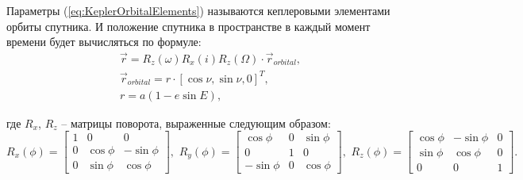 Параметры (\ref{eq:KeplerOrbitalElements}) называются кеплеровыми элементами
орбиты спутника.
И положение спутника в пространстве в каждый момент времени будет вычисляться по формуле:
\begin{equation}
  \begin{aligned}
    & \vec{r} = R_z(\omega)R_x(i)R_z(\Omega) \cdot \vec{r}_{orbital}, \\
    & \vec{r}_{orbital} = r \cdot [\cos\nu, \sin\nu, 0]^{T}, \\
    & r = a(1 - e\sin E),
  \end{aligned}
\end{equation}\par
где $R_x$, $R_z$ -- матрицы поворота, выраженные следующим образом:
\begin{equation}
    R_x(\phi) = \begin{bmatrix}
       1        &  0        &   0        \\
       0        &  \cos\phi &  -\sin\phi \\
       0        &  \sin\phi &   \cos\phi
    \end{bmatrix},\,\,
    R_y(\phi) = \begin{bmatrix}
       \cos\phi &  0        &  \sin\phi \\
       0        &  1        &  0        \\
      -\sin\phi &  0        &  \cos\phi
    \end{bmatrix},\,\,
    R_z(\phi) = \begin{bmatrix}
      \cos\phi & -\sin\phi & 0 \\
      \sin\phi &  \cos\phi & 0 \\
      0        &  0        & 1
    \end{bmatrix}.
\end{equation}
%
